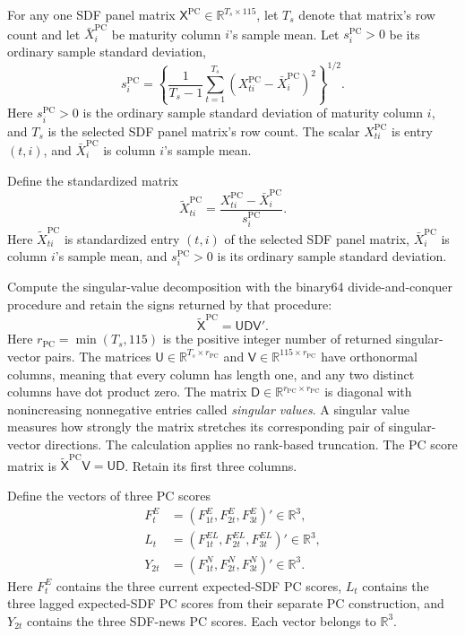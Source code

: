 \documentclass[11pt]{article}
\begin{document}
For any one SDF panel matrix \(\mathsf X^{\mathrm{PC}}\in\mathbb R^{T_s\times115}\), let \(T_s\)
denote that matrix's row count and let
\(\bar X_i^{\mathrm{PC}}\) be maturity column \(i\)'s sample mean.
Let \(s_i^{\mathrm{PC}}>0\) be its ordinary sample standard deviation,
\[
 s_i^{\mathrm{PC}}=\left\{\frac{1}{T_s-1}\sum_{t=1}^{T_s}
 (X_{ti}^{\mathrm{PC}}-\bar X_i^{\mathrm{PC}})^2\right\}^{1/2}.
\]
Here \(s_i^{\mathrm{PC}}>0\) is the ordinary sample standard deviation of maturity column \(i\),
and \(T_s\) is the selected SDF panel matrix's row count. The scalar
\(X_{ti}^{\mathrm{PC}}\) is entry \((t,i)\), and \(\bar X_i^{\mathrm{PC}}\) is column \(i\)'s
sample mean.

Define the standardized matrix
\begin{equation*}
 \widetilde X_{ti}^{\mathrm{PC}}=
 \frac{X_{ti}^{\mathrm{PC}}-\bar X_i^{\mathrm{PC}}}{s_i^{\mathrm{PC}}}.
\end{equation*}
Here \(\widetilde X_{ti}^{\mathrm{PC}}\) is standardized entry \((t,i)\) of the selected SDF panel
matrix, \(\bar X_i^{\mathrm{PC}}\) is column \(i\)'s sample mean, and
\(s_i^{\mathrm{PC}}>0\) is its ordinary sample standard deviation.

Compute the singular-value decomposition with the binary64 divide-and-conquer procedure and
retain the signs returned by that procedure:
\begin{equation*}
 \widetilde{\mathsf X}^{\mathrm{PC}}=\mathsf U\mathsf D\mathsf V'.
\end{equation*}
Here \(r_{\mathrm{PC}}=\min(T_s,115)\) is the positive integer number of returned singular-vector
pairs. The matrices \(\mathsf U\in\mathbb R^{T_s\times r_{\mathrm{PC}}}\) and
\(\mathsf V\in\mathbb R^{115\times r_{\mathrm{PC}}}\) have
orthonormal columns, meaning that every column has length one, and any two distinct columns
have dot product zero. The matrix
\(\mathsf D\in\mathbb R^{r_{\mathrm{PC}}\times r_{\mathrm{PC}}}\) is diagonal with nonincreasing
nonnegative entries called \emph{singular values}. A singular value measures how strongly the
matrix stretches its corresponding pair of singular-vector directions. The calculation applies no
rank-based truncation. The PC score matrix is
\(\widetilde{\mathsf X}^{\mathrm{PC}}\mathsf V=\mathsf U\mathsf D\). Retain its first
three columns.

Define the vectors of three PC scores
\begin{align*}
 F^E_t&=(F^E_{1t},F^E_{2t},F^E_{3t})'\in\mathbb R^3,\\
 L_t&=(F^{EL}_{1t},F^{EL}_{2t},F^{EL}_{3t})'\in\mathbb R^3,\\
 Y_{2t}&=(F^N_{1t},F^N_{2t},F^N_{3t})'\in\mathbb R^3.
\end{align*}
Here \(F_t^E\) contains the three current expected-SDF PC scores, \(L_t\) contains the three lagged
expected-SDF PC scores from their separate PC construction, and \(Y_{2t}\) contains the three
SDF-news PC scores. Each vector belongs to \(\mathbb R^3\).
\end{document}
